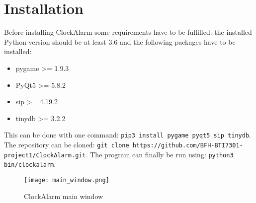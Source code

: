 \chapter{Installation}

Before installing ClockAlarm some requirements have to be fulfilled: the
installed Python version should be at least 3.6 and the following packages have
to be installed:

\begin{itemize}
    \item pygame >= 1.9.3
    \item PyQt5 >= 5.8.2 
    \item sip >= 4.19.2
    \item tinydb >= 3.2.2 
\end{itemize}

This can be done with one command: \texttt{pip3 install pygame pyqt5 sip tinydb}.
The repository can be cloned: \texttt{git clone
https://github.com/BFH-BTI7301-project1/ClockAlarm.git}.
The program can finally be run using: \texttt{python3 bin/clockalarm}.

\begin{figure}[h]
    \centering
    \caption{ClockAlarm main window}
    \texttt{[image: main\_window.png]}
\end{figure}

